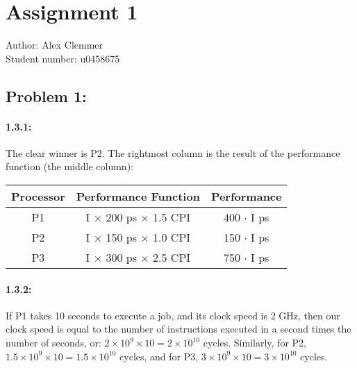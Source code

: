 \documentclass[a4paper]{article}
\begin{document}
\section*{Assignment 1 }
Author: Alex Clemmer\\
Student number: u0458675

\subsection*{Problem 1:}
\paragraph*{1.3.1:} The clear winner is P2. The rightmost column is the result of the performance function (the middle column):

\begin{center}
\begin{tabular}{|c|c|c|c|c|}
\hline
Processor & \multicolumn{2}{|c|}{Performance Function} & \multicolumn{2}{|c|}{Performance}\\
\hline
P1 & \multicolumn{2}{|c|}{I $\times$ 200 ps $\times$ 1.5 CPI} & \multicolumn{2}{|c|}{400 $\cdot$ I ps}\\
\hline
P2 & \multicolumn{2}{|c|}{I $\times$ 150 ps $\times$ 1.0 CPI} & \multicolumn{2}{|c|}{150 $\cdot$ I ps}\\
\hline
P3 & \multicolumn{2}{|c|}{I $\times$ 300 ps $\times$ 2.5 CPI} & \multicolumn{2}{|c|}{750 $\cdot$ I ps}\\
\hline
\end{tabular}
\end{center}

\paragraph*{1.3.2:} If P1 takes 10 seconds to execute a job, and its clock speed is 2 GHz, then our clock speed is equal to the number of instructions executed in a second times the number of seconds, or: $2\times10^9 \times 10 =  2\times10^{10}$ cycles. Similarly, for P2, $1.5\times10^9 \times 10 = 1.5\times10^{10}$ cycles, and for P3, $3\times10^9 \times 10 = 3\times10^{10}$ cycles.
\end{document}
